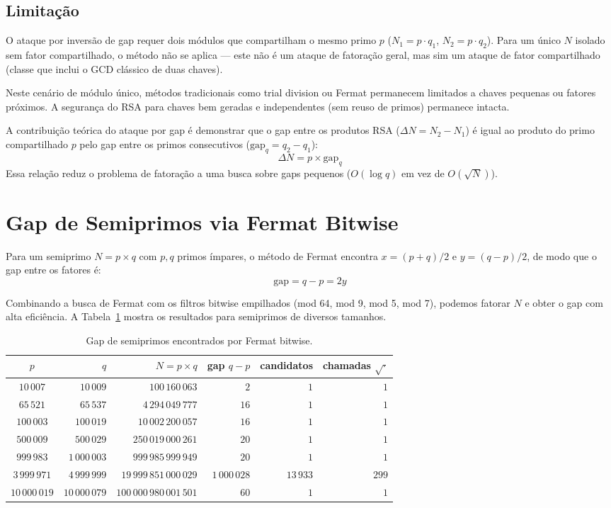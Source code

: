 \documentclass[12pt,a4paper]{article}
\theoremstyle{plain}
\begin{document}
\subsection{Limitação}

O ataque por inversão de gap requer dois módulos que compartilham
o mesmo primo $p$ ($N_1 = p \cdot q_1$, $N_2 = p \cdot q_2$).
Para um único $N$ isolado sem fator compartilhado, o método não
se aplica --- este não é um ataque de fatoração geral, mas sim
um ataque de fator compartilhado (classe que inclui o GCD
clássico de duas chaves).

Neste cenário de módulo único, métodos tradicionais como trial
division ou Fermat permanecem limitados a chaves pequenas ou
fatores próximos.  A segurança do RSA para chaves bem geradas e
independentes (sem reuso de primos) permanece intacta.

A contribuição teórica do ataque por gap é demonstrar que
o gap entre os produtos RSA ($\Delta N = N_2 - N_1$) é igual ao
produto do primo compartilhado $p$ pelo gap entre os primos
consecutivos ($\text{gap}_q = q_2 - q_1$):
\[
\Delta N = p \times \text{gap}_q
\]
Essa relação reduz o problema de
fatoração a uma busca sobre gaps pequenos ($O(\log q)$ em vez
de $O(\sqrt{N})$).

\section{Gap de Semiprimos via Fermat Bitwise}
\label{sec:semiprime_gap}

Para um semiprimo $N = p \times q$ com $p,q$ primos ímpares, o
método de Fermat encontra $x = (p+q)/2$ e $y = (q-p)/2$, de modo
que o gap entre os fatores é:
\[
\text{gap} = q - p = 2y
\]

Combinando a busca de Fermat com os filtros bitwise empilhados
(mod 64, mod 9, mod 5, mod 7), podemos fatorar $N$ e obter o gap
com alta eficiência.  A Tabela~\ref{tab:semiprime_gap} mostra os
resultados para semiprimos de diversos tamanhos.

\begin{table}[htbp]
\centering
\caption{Gap de semiprimos encontrados por Fermat bitwise.}
\label{tab:semiprime_gap}
\begin{tabular}{crrrrr}
\hline
$p$ & $q$ & $N = p\times q$ & gap $q-p$ & candidatos & chamadas $\sqrt{\cdot}$ \\
\hline
$10\,007$ & $10\,009$ & $100\,160\,063$ & $2$ & $1$ & $1$ \\
$65\,521$ & $65\,537$ & $4\,294\,049\,777$ & $16$ & $1$ & $1$ \\
$100\,003$ & $100\,019$ & $10\,002\,200\,057$ & $16$ & $1$ & $1$ \\
$500\,009$ & $500\,029$ & $250\,019\,000\,261$ & $20$ & $1$ & $1$ \\
$999\,983$ & $1\,000\,003$ & $999\,985\,999\,949$ & $20$ & $1$ & $1$ \\
$3\,999\,971$ & $4\,999\,999$ & $19\,999\,851\,000\,029$ & $1\,000\,028$ & $13\,933$ & $299$ \\
$10\,000\,019$ & $10\,000\,079$ & $100\,000\,980\,001\,501$ & $60$ & $1$ & $1$ \\
\hline
\end{tabular}
\end{table}
\end{document}
